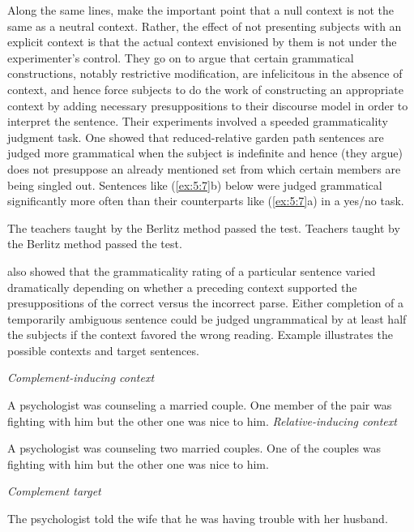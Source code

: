 Along the same lines, \citet{CrainSteedman1985} make the important point that a null context is not the same as a neutral context. Rather, the effect of not presenting subjects with an explicit context is that the actual context envisioned by them is not under the experimenter's control. They go on to argue that certain grammatical constructions, notably restrictive modification, are infelicitous in the
absence of context, and hence force subjects to do the work of constructing an appropriate context by adding necessary presuppositions to their discourse model in order to interpret the sentence. Their experiments involved a speeded grammaticality judgment task. One showed that reduced-relative garden path sentences are judged more grammatical when the subject is indefinite and hence (they argue) does not presuppose an already mentioned set from which certain members are being singled out. Sentences like (\ref{ex:5:7}b) below were judged grammatical significantly more often than their counterparts like (\ref{ex:5:7}a) in a yes/no task.

\ea\label{ex:5:7}
\ea The teachers taught by the Berlitz method passed the test.
\ex  Teachers taught by the Berlitz method passed the test.
\z
\z

\noindent
\citeauthor{CrainSteedman1985} also showed that the grammaticality rating of a particular sentence varied dramatically depending on whether a preceding context supported the presuppositions of the correct versus the incorrect parse. Either completion of a temporarily ambiguous sentence could be judged ungrammatical by at least half the subjects if the context favored the wrong reading. Example  illustrates the possible contexts and target sentences.

\ea\label{ex:5:8}
\ea       \textit{Complement-inducing  context}

A psychologist was counseling a married couple. One member of the pair was fighting with him but the other one was nice to him.
\ex  \textit{Relative-inducing  context}

A psychologist was counseling two married couples. One of the couples was fighting with him but the other one was nice to him.

\ex  \textit{Complement  target}

The psychologist told the wife that he was having trouble with her husband.

